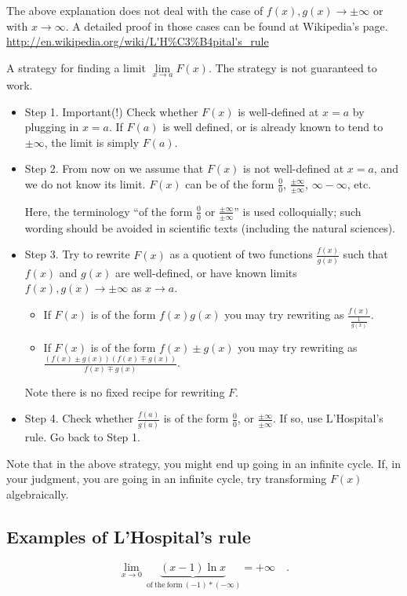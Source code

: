 \documentclass[12pt]{book}
\begin{document}
The above explanation does not deal with the case of $f(x), g(x)\to\pm \infty $ or with $x\to \infty$. A detailed proof in those cases can be found at Wikipedia's page.
\url{http://en.wikipedia.org/wiki/L'H%C3%B4pital's_rule}

A strategy for finding a limit $\lim\limits_{x\to a}F(x)$. The strategy is not guaranteed to work.
\begin{itemize}
\item Step 1. Important(!) Check whether $F(x)$ is well-defined at $x=a$ by plugging in $x=a$. If $F(a)$ is well defined, or is already known to tend to $\pm \infty$, the limit is simply $F(a)$.
\item Step 2. From now on we assume that $F(x)$ is not well-defined at $x=a$, and we do not know its limit. $F(x)$ can be of the form $\frac{0}{0}$, $\frac{\pm \infty }{\pm \infty}$, $ \infty-\infty$, etc.

Here, the terminology ``of the form $\frac{0}{0}$ or $\frac{\pm\infty}{\pm \infty}$'' is used colloquially; such wording should be avoided in scientific texts (including the natural sciences).
\item Step 3. Try to rewrite $F(x)$ as a quotient of two functions $\frac{f(x)}{g(x)}$ such that $f(x)$ and $g(x)$ are well-defined, or have known limits $f(x), g(x)\to \pm \infty$ as $x\to a$.
\begin{itemize}
\item If $F(x)$ is of the form $f(x)g(x)$ you may try rewriting as $\frac{f(x)}{\frac{1}{g(x)}}$.
\item If $F(x)$ is of the form $f(x)\pm g(x)$ you may try rewriting as $\frac{(f(x)\pm g(x))(f(x)\mp g(x))}{f(x)\mp g(x)}$.
\end{itemize}
Note there is no fixed recipe for rewriting $F$.
\item Step 4. Check whether $\frac{f(a)}{g(a)}$ is of the form $\frac{0}{0}$, or $\frac{\pm\infty}{\pm \infty}$. If so, use L'Hospital's rule. Go back to Step 1.
\end{itemize}
Note that in the above strategy, you might end up going in an infinite cycle. If, in your judgment, you are going in an infinite cycle, try transforming $F(x)$ algebraically.
\subsection{Examples of L'Hospital's rule}
\[
\lim\limits_{x\to 0} \underbrace{(x-1)\ln x}_{\mathrm{~of~the~form~}(-1)*(-\infty)} =+\infty\quad .
\]
\end{document}
